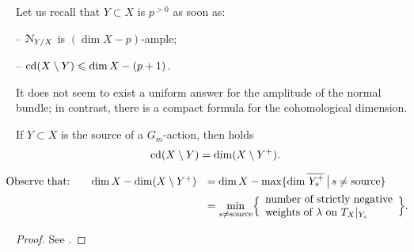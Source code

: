 \documentclass[11pt,reqno]{amsart}
\let\euf\EuScript
\let\ovl\overline
\let\nit\noindent
\numberwithin{equation}{section}
\numberwithin{figure}{section}
\let\l\lambda
\let\sm\setminus
\let\les\leqslant
\begin{document}
Let us recall that $Y\subset X$ is $p^{{>0}}$ as soon as:  

-- ${{\euf N}}_{Y/X}$ is $(\dim X-p)$-ample; 

-- ${{\rm cd}}(X\sm Y)\les\dim X-(p+1)$.

\nit It does not seem to exist a uniform answer for the amplitude of the normal bundle; 
in contrast, there is a compact formula for the cohomological dimension. 

\begin{m-proposition}\label{prop:cdX-Y}
If $Y\subset X$ is the source of a $G_m$-action, then holds 
$$
{{\rm cd}}(X\sm Y)=\dim(X\sm Y^+).
$$
\end{m-proposition}\vspace{-10pt}
\begin{equation}\label{eq:xy+}\kern-1\parindent
\begin{array}{lll}
\text{Observe that:}\quad&
\dim X-\dim (X\sm Y^+)
&
=\dim X-\max\{\dim\ovl{\,Y_s^+}\,\big|\, s\neq{\rm source}\}
\\[1ex] 
&&
=
\underset{s\neq{\rm source}}{\min}
\Big\{
				\begin{array}{l}
					\text{number of strictly negative}\\ 
					\text{weights of $\l$ on $T_X|_{Y_s}$}
				\end{array}
\Big\}.
\end{array}
\end{equation}

\begin{proof} 
See \cite{hal+taj}. 
\end{proof}
\end{document}
